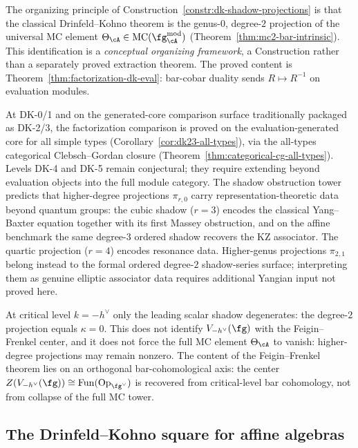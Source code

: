 \begin{remark}
\label{rem:dk-shadow-status}
The organizing principle of
Construction~\ref{constr:dk-shadow-projections} is that the classical
Drinfeld--Kohno theorem is the genus-$0$, degree-$2$ projection of the
universal MC element $\Theta_\cA \in \mathrm{MC}(\fg^{\mathrm{mod}}_\cA)$
(Theorem~\ref{thm:mc2-bar-intrinsic}).
This identification is a \emph{conceptual organizing
framework}, a Construction rather than a separately proved extraction
theorem. The proved content is
Theorem~\ref{thm:factorization-dk-eval}: bar-cobar duality sends
$R \mapsto R^{-1}$ on evaluation modules.

At DK-0/1 and on the generated-core comparison surface
traditionally packaged as DK-2/3, the factorization comparison is
proved on the evaluation-generated core for all simple types
\textup{(}Corollary~\ref{cor:dk23-all-types}\textup{)}, via the
all-types categorical Clebsch--Gordan closure
\textup{(}Theorem~\ref{thm:categorical-cg-all-types}\textup{)}.
Levels DK-4 and DK-5
remain conjectural; they require extending beyond evaluation objects
into the full module category. The shadow obstruction tower predicts that
higher-degree projections $\pi_{r,0}$ carry representation-theoretic
data beyond quantum groups: the cubic shadow ($r = 3$) encodes the
classical Yang--Baxter equation together with its first Massey
obstruction, and on the affine benchmark the same degree-$3$ ordered
shadow recovers the KZ associator. The quartic projection
($r = 4$) encodes resonance data. Higher-genus projections
$\pi_{2,1}$ belong instead to the formal ordered degree-$2$
shadow-series surface; interpreting them as genuine elliptic
associator data requires additional Yangian input not proved here.

At critical level $k = -h^\vee$ only the leading scalar shadow
degenerates: the degree-$2$ projection equals $\kappa = 0$.
This does not identify $V_{-h^\vee}(\fg)$ with the
Feigin--Frenkel center, and it does not force the full MC
element $\Theta_\cA$ to vanish: higher-degree projections may
remain nonzero. The content of the Feigin--Frenkel theorem lies
on an orthogonal bar-cohomological axis: the center
$Z(V_{-h^\vee}(\fg)) \cong \mathrm{Fun}(\mathrm{Op}_{\fg^\vee})$
is recovered from critical-level bar cohomology, not from
collapse of the full MC tower.
\end{remark}

\subsection{The Drinfeld--Kohno square for affine algebras}

